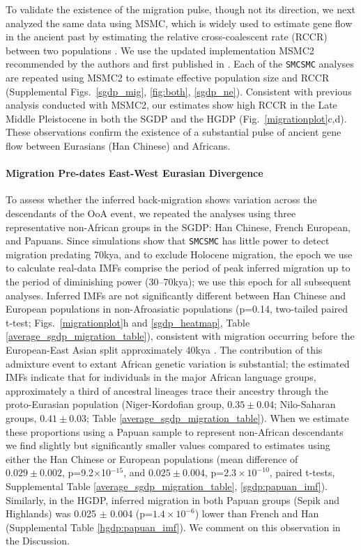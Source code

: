 \documentclass{article}
\begin{document}
To validate the existence of the migration pulse, though not its direction, we next analyzed the same data using MSMC, which is widely used to estimate gene flow in the ancient past by estimating the relative cross-coalescent rate (RCCR) between two populations \cite{Schiffels2014a,Fan2019, Pagani2015, Raghavan2015}. We use the updated implementation MSMC2 recommended by the authors and first published in \cite{Malaspinas2016}. Each of the {\tt SMCSMC} analyses are repeated using MSMC2 to estimate effective population size and RCCR (Supplemental Figs.\ \ref{sgdp_mig}, \ref{fig:both}, \ref{sgdp_ne}). Consistent with previous analysis conducted with MSMC2, our estimates show high RCCR in the Late Middle Pleistocene in both the SGDP and the HGDP (Fig.\ \ref{migrationplot}c,d). These observations confirm the existence of a substantial pulse of ancient gene flow between Eurasians (Han Chinese) and Africans.

\paragraph{Migration Pre-dates East-West Eurasian Divergence}

To assess whether the inferred back-migration shows variation across the descendants of the OoA event, we repeated the analyses using three representative non-African groups in the SGDP: Han Chinese, French European, and Papuans.  Since simulations show that {\tt SMCSMC} has little power to detect migration predating 70kya, and to exclude Holocene migration, the epoch we use to calculate real-data IMFs comprise the period of peak inferred migration up to the period of diminishing power (30--70kya); we use this epoch for all subsequent analyses. Inferred IMFs are not significantly different between Han Chinese and European populations in non-Afroasiatic populations (p=0.14, two-tailed paired t-test; Figs.\ \ref{migrationplot}h and \ref{sgdp_heatmap}, Table \ref{average_sgdp_migration_table}), consistent with migration occurring before the European-East Asian split approximately 40kya \cite{Mathieson2014}.  The contribution of this admixture event to extant African genetic variation is substantial; the estimated IMFs indicate that for individuals in the major African language groups, approximately a third of ancestral lineages trace their ancestry through the proto-Eurasian population (Niger-Kordofian group, $0.35\pm 0.04$; Nilo-Saharan groups, $0.41\pm 0.03$; Table \ref{average_sgdp_migration_table}). When we estimate these proportions using a Papuan sample to represent non-African descendants we find slightly but significantly smaller values compared to estimates using either the Han Chinese or European populations (mean difference of $0.029 \pm 0.002$, p=9.2$\times$10$^{-15}$, and $0.025 \pm 0.004$, p=$2.3\times 10^{-10}$, paired t-tests, Supplemental Table \ref{average_sgdp_migration_table}, \ref{sgdp:papuan_imf}). Similarly, in the HGDP, inferred migration in both Papuan groups (Sepik and Highlands) was 0.025 $\pm$ 0.004 (p=$1.4\times10^{-6}$) lower than French and Han (Supplemental Table \ref{hgdp:papuan_imf}).  We comment on this observation in the Discussion. 
\end{document}
